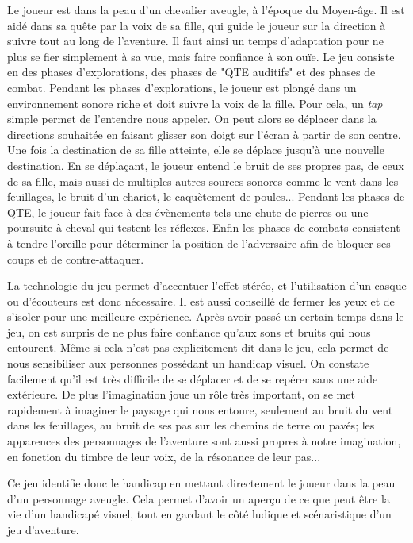 \documentclass[a4paper,11pt]{article}
\begin{document}
Le joueur est dans la peau d’un chevalier aveugle, à l’époque du Moyen-âge. Il est aidé dans sa quête par la voix de sa fille, qui guide le joueur sur la direction à suivre tout au long de l’aventure. Il faut ainsi un temps d’adaptation pour ne plus se fier simplement à sa vue, mais faire confiance à son ouïe. Le jeu consiste en des phases d’explorations, des phases de "QTE auditifs" et des phases de combat. Pendant les phases d’explorations, le joueur est plongé dans un environnement sonore riche et doit suivre la voix de la fille. Pour cela, un \textit{tap} simple permet de l’entendre nous appeler. On peut alors se déplacer dans la directions souhaitée en faisant glisser son doigt sur l’écran à partir de son centre. Une fois la destination de sa fille atteinte, elle se déplace jusqu’à une nouvelle destination. En se déplaçant, le joueur entend le bruit de ses propres pas, de ceux de sa fille, mais aussi de multiples autres sources sonores comme le vent dans les feuillages, le bruit d’un chariot, le caquètement de poules... Pendant les phases de QTE, le joueur fait face à des évènements tels une chute de pierres ou une poursuite à cheval qui testent les réflexes. Enfin les phases de combats consistent à tendre l’oreille pour déterminer la position de l’adversaire afin de bloquer ses coups et de contre-attaquer.

La technologie du jeu permet d’accentuer l’effet stéréo, et l’utilisation d’un casque ou d’écouteurs est donc nécessaire. Il est aussi conseillé de fermer les yeux et de s’isoler pour une meilleure expérience. Après avoir passé un certain temps dans le jeu, on est surpris de ne plus faire confiance qu’aux sons et bruits qui nous entourent. Même si cela n’est pas explicitement dit dans le jeu, cela permet de nous sensibiliser aux personnes possédant un handicap visuel. On constate facilement qu’il est très difficile de se déplacer et de se repérer sans une aide extérieure. De plus l’imagination joue un rôle très important, on se met rapidement à imaginer le paysage qui nous entoure, seulement au bruit du vent dans les feuillages, au bruit de ses pas sur les chemins de terre ou pavés; les apparences des personnages de l’aventure sont aussi propres à notre imagination, en fonction du timbre de leur voix, de la résonance de leur pas...

Ce jeu identifie donc le handicap en mettant directement le joueur dans la peau d’un personnage aveugle. Cela permet d’avoir un aperçu de ce que peut être la vie d’un handicapé visuel, tout en gardant le côté ludique et scénaristique d’un jeu d’aventure.
\end{document}
